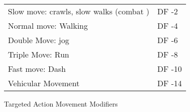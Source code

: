 \begin{SHTable}
	\begin{tabular}{ll}
	Slow move: crawls, slow walks (combat )   & DF -2 \\
	Normal move: Walking					   & DF -4 \\
	Double Move: jog						   & DF -6 \\
	Triple Move: Run						   & DF -8 \\
	Fast move: Dash						   & DF -10\\
	Vehicular Movement						   & DF -14 \\ 
	\end{tabular}
    \caption{Targeted Action Movement Modifiers}
\end{SHTable}
